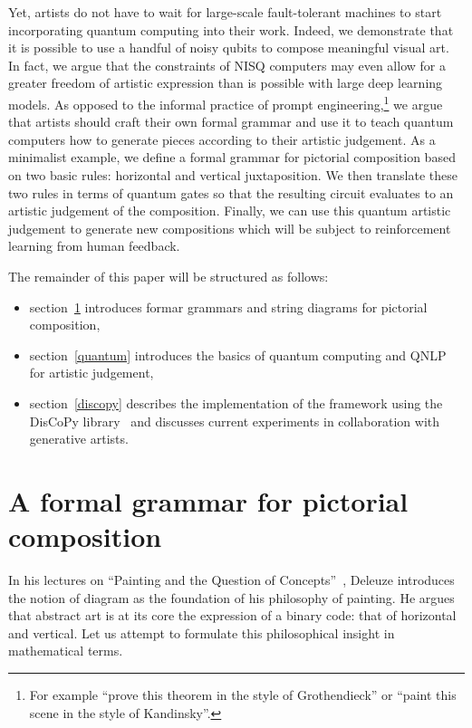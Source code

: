 Yet, artists do not have to wait for large-scale fault-tolerant machines to start incorporating quantum computing into their work.
Indeed, we demonstrate that it is possible to use a handful of noisy qubits to compose meaningful visual art.
In fact, we argue that the constraints of NISQ computers may even allow for a greater freedom of artistic expression than is possible with large deep learning models.
As opposed to the informal practice of prompt engineering,\footnote
{For example ``prove this theorem in the style of Grothendieck'' or ``paint this scene in the style of Kandinsky''.} we argue that artists should craft their own formal grammar and use it to teach quantum computers how to generate pieces according to their artistic judgement.
As a minimalist example, we define a formal grammar for pictorial composition based on two basic rules: horizontal and vertical juxtaposition.
We then translate these two rules in terms of quantum gates so that the resulting circuit evaluates to an artistic judgement of the composition.
Finally, we can use this quantum artistic judgement to generate new compositions which will be subject to reinforcement learning from human feedback.

The remainder of this paper will be structured as follows:
\begin{itemize}
\item section~\ref{grammar} introduces formar grammars and string diagrams for pictorial composition,
\item section~\ref{quantum} introduces the basics of quantum computing and QNLP for artistic judgement,
\item section~\ref{discopy} describes the implementation of the framework using the DisCoPy library~\cite{DeFeliceEtAl20} and discusses current experiments in collaboration with generative artists.
\end{itemize}

\section{A formal grammar for pictorial composition}\label{grammar}

In his lectures on ``Painting and the Question of Concepts''~\cite{Deleuze81}, Deleuze introduces the notion of diagram as the foundation of his philosophy of painting.
He argues that abstract art is at its core the expression of a binary code: that of horizontal and vertical.
Let us attempt to formulate this philosophical insight in mathematical terms.


